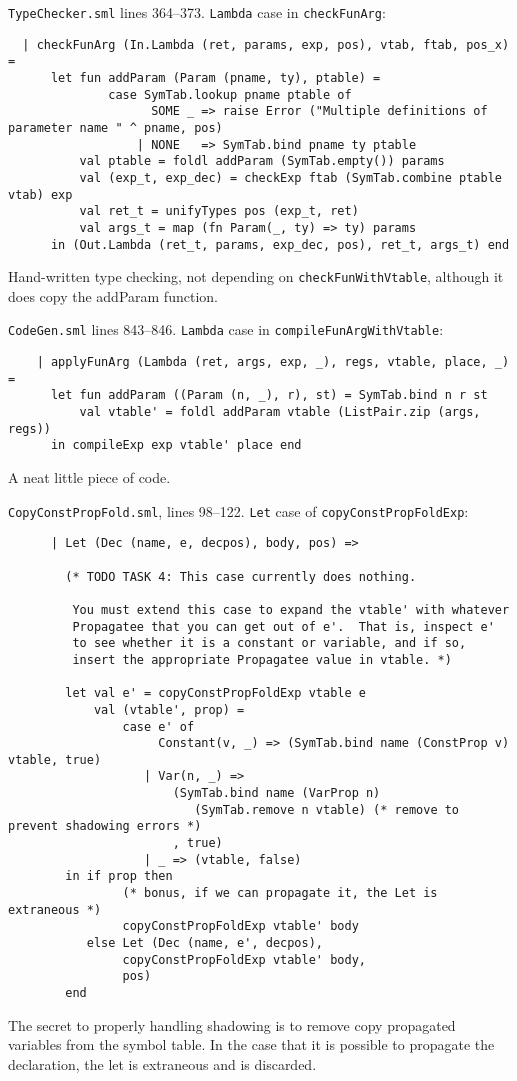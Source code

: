 \documentclass[12pt, a4paper]{article}
\begin{document}
\texttt{TypeChecker.sml} lines 364--373. \texttt{Lambda} case in \texttt{checkFunArg}:
\begin{lstlisting}
  | checkFunArg (In.Lambda (ret, params, exp, pos), vtab, ftab, pos_x) =
      let fun addParam (Param (pname, ty), ptable) =
              case SymTab.lookup pname ptable of
                    SOME _ => raise Error ("Multiple definitions of parameter name " ^ pname, pos)
                  | NONE   => SymTab.bind pname ty ptable
          val ptable = foldl addParam (SymTab.empty()) params
          val (exp_t, exp_dec) = checkExp ftab (SymTab.combine ptable vtab) exp
          val ret_t = unifyTypes pos (exp_t, ret)
          val args_t = map (fn Param(_, ty) => ty) params
      in (Out.Lambda (ret_t, params, exp_dec, pos), ret_t, args_t) end
\end{lstlisting}
Hand-written type checking, not depending on \texttt{checkFunWithVtable}, although it does
copy the addParam function.

\texttt{CodeGen.sml} lines 843--846. \texttt{Lambda} case in \texttt{compileFunArgWithVtable}:
\begin{lstlisting}
    | applyFunArg (Lambda (ret, args, exp, _), regs, vtable, place, _) =
      let fun addParam ((Param (n, _), r), st) = SymTab.bind n r st
          val vtable' = foldl addParam vtable (ListPair.zip (args, regs))
      in compileExp exp vtable' place end
\end{lstlisting}
A neat little piece of code.

\texttt{CopyConstPropFold.sml}, lines 98--122. \texttt{Let} case of
\texttt{copyConstPropFoldExp}:
\begin{lstlisting}
      | Let (Dec (name, e, decpos), body, pos) =>

        (* TODO TASK 4: This case currently does nothing.

         You must extend this case to expand the vtable' with whatever
         Propagatee that you can get out of e'.  That is, inspect e'
         to see whether it is a constant or variable, and if so,
         insert the appropriate Propagatee value in vtable. *)

        let val e' = copyConstPropFoldExp vtable e
            val (vtable', prop) =
                case e' of 
                     Constant(v, _) => (SymTab.bind name (ConstProp v) vtable, true)
                   | Var(n, _) =>
                       (SymTab.bind name (VarProp n)
                          (SymTab.remove n vtable) (* remove to prevent shadowing errors *)
                       , true)
                   | _ => (vtable, false)
        in if prop then
                (* bonus, if we can propagate it, the Let is extraneous *)
                copyConstPropFoldExp vtable' body
           else Let (Dec (name, e', decpos),
                copyConstPropFoldExp vtable' body,
                pos)
        end
\end{lstlisting}
The secret to properly handling shadowing is to remove copy propagated variables from the
symbol table. In the case that it is possible to propagate the declaration, the let is extraneous
and is discarded.
\end{document}
